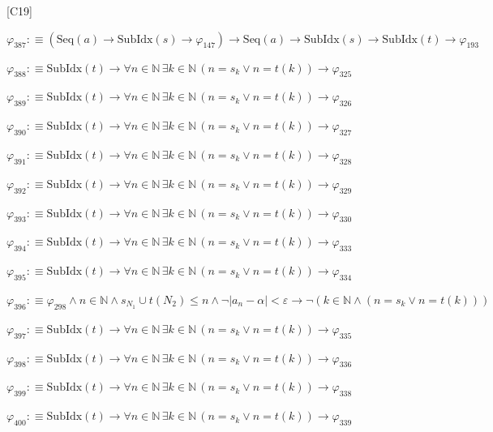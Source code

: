 \begin{fullproof}{[C19]}
\begin{abbrevlist}
\item $\varphi_{387} :\equiv (\mathrm{Seq}(a) \to \mathrm{SubIdx}(s) \to \varphi_{147}) \to \mathrm{Seq}(a) \to \mathrm{SubIdx}(s) \to \mathrm{SubIdx}(t) \to \varphi_{193}$
\item $\varphi_{388} :\equiv \mathrm{SubIdx}(t) \to \forall n \in \mathbb{N}\,\exists k \in \mathbb{N}\,(n = s_{k} \lor n = t(k)) \to \varphi_{325}$
\item $\varphi_{389} :\equiv \mathrm{SubIdx}(t) \to \forall n \in \mathbb{N}\,\exists k \in \mathbb{N}\,(n = s_{k} \lor n = t(k)) \to \varphi_{326}$
\item $\varphi_{390} :\equiv \mathrm{SubIdx}(t) \to \forall n \in \mathbb{N}\,\exists k \in \mathbb{N}\,(n = s_{k} \lor n = t(k)) \to \varphi_{327}$
\item $\varphi_{391} :\equiv \mathrm{SubIdx}(t) \to \forall n \in \mathbb{N}\,\exists k \in \mathbb{N}\,(n = s_{k} \lor n = t(k)) \to \varphi_{328}$
\item $\varphi_{392} :\equiv \mathrm{SubIdx}(t) \to \forall n \in \mathbb{N}\,\exists k \in \mathbb{N}\,(n = s_{k} \lor n = t(k)) \to \varphi_{329}$
\item $\varphi_{393} :\equiv \mathrm{SubIdx}(t) \to \forall n \in \mathbb{N}\,\exists k \in \mathbb{N}\,(n = s_{k} \lor n = t(k)) \to \varphi_{330}$
\item $\varphi_{394} :\equiv \mathrm{SubIdx}(t) \to \forall n \in \mathbb{N}\,\exists k \in \mathbb{N}\,(n = s_{k} \lor n = t(k)) \to \varphi_{333}$
\item $\varphi_{395} :\equiv \mathrm{SubIdx}(t) \to \forall n \in \mathbb{N}\,\exists k \in \mathbb{N}\,(n = s_{k} \lor n = t(k)) \to \varphi_{334}$
\item $\varphi_{396} :\equiv \varphi_{298} \land n \in \mathbb{N} \land s_{N_{1}} \cup t(N_{2}) \leq n \land \neg \lvert a_{n} - \alpha \rvert < \varepsilon \to \neg (k \in \mathbb{N} \land (n = s_{k} \lor n = t(k)))$
\item $\varphi_{397} :\equiv \mathrm{SubIdx}(t) \to \forall n \in \mathbb{N}\,\exists k \in \mathbb{N}\,(n = s_{k} \lor n = t(k)) \to \varphi_{335}$
\item $\varphi_{398} :\equiv \mathrm{SubIdx}(t) \to \forall n \in \mathbb{N}\,\exists k \in \mathbb{N}\,(n = s_{k} \lor n = t(k)) \to \varphi_{336}$
\item $\varphi_{399} :\equiv \mathrm{SubIdx}(t) \to \forall n \in \mathbb{N}\,\exists k \in \mathbb{N}\,(n = s_{k} \lor n = t(k)) \to \varphi_{338}$
\item $\varphi_{400} :\equiv \mathrm{SubIdx}(t) \to \forall n \in \mathbb{N}\,\exists k \in \mathbb{N}\,(n = s_{k} \lor n = t(k)) \to \varphi_{339}$

\end{abbrevlist}
\end{fullproof}
